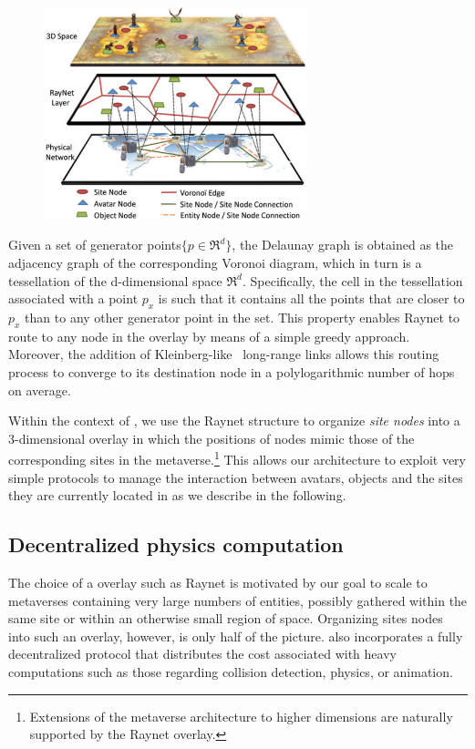 \begin{figure}
\center
\includegraphics[width=3in]{Figures/Overview.pdf}
\label{Fig:Overview}
\end{figure}

Given a set of generator points$\{p \in \Re^d\}$, the Delaunay graph
is obtained as the adjacency graph of the corresponding Voronoi
diagram, which in turn is a tessellation of the d-dimensional space
$\Re^d$. Specifically, the cell in the tessellation associated with a
point $p_x$ is such that it contains all the points that are closer to
$p_x$ than to any other generator point in the set. This property
enables Raynet to route to any node in the overlay by means of a
simple greedy approach. Moreover, the addition of
Kleinberg-like~\cite{ jk:smallworld} long-range links allows this
routing process to converge to its destination node in a
polylogarithmic number of hops on average.

Within the context of \sol, we use the Raynet structure to organize
\emph{site nodes} into a 3-dimensional overlay in which the positions
of nodes mimic those of the corresponding sites in the
metaverse.\footnote{Extensions of the metaverse architecture to higher
  dimensions are naturally supported by the Raynet overlay.} This
allows our architecture to exploit very simple protocols to manage the
interaction between avatars, objects and the sites they are currently
located in as we describe in the following.

\subsection{Decentralized physics computation}
\label{sec:decentr-phys-comp}
The choice of a \ptp overlay such as Raynet is motivated by our goal
to scale to metaverses containing very large numbers of entities,
possibly gathered within the same site or within an otherwise
small region of space. Organizing sites nodes into such an overlay,
however, is only half of the picture. \sol also incorporates a fully
decentralized protocol that distributes the cost associated with heavy
computations such as those regarding collision detection, physics, or
animation.


